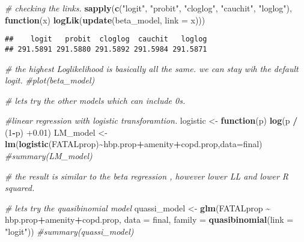 \documentclass[]{article}
\newenvironment{Shaded}{\begin{snugshade}}{\end{snugshade}}
\newcommand{\CommentTok}[1]{\textcolor[rgb]{0.56,0.35,0.01}{\textit{#1}}}
\newcommand{\ControlFlowTok}[1]{\textcolor[rgb]{0.13,0.29,0.53}{\textbf{#1}}}
\newcommand{\DataTypeTok}[1]{\textcolor[rgb]{0.13,0.29,0.53}{#1}}
\newcommand{\DecValTok}[1]{\textcolor[rgb]{0.00,0.00,0.81}{#1}}
\newcommand{\FloatTok}[1]{\textcolor[rgb]{0.00,0.00,0.81}{#1}}
\newcommand{\KeywordTok}[1]{\textcolor[rgb]{0.13,0.29,0.53}{\textbf{#1}}}
\newcommand{\NormalTok}[1]{#1}
\newcommand{\OperatorTok}[1]{\textcolor[rgb]{0.81,0.36,0.00}{\textbf{#1}}}
\newcommand{\StringTok}[1]{\textcolor[rgb]{0.31,0.60,0.02}{#1}}
\begin{document}
\begin{Shaded}
\begin{Highlighting}[]
\CommentTok{\# checking the links.}
\KeywordTok{sapply}\NormalTok{(}\KeywordTok{c}\NormalTok{(}\StringTok{"logit"}\NormalTok{, }\StringTok{"probit"}\NormalTok{, }\StringTok{"cloglog"}\NormalTok{, }\StringTok{"cauchit"}\NormalTok{, }\StringTok{"loglog"}\NormalTok{),}
\ControlFlowTok{function}\NormalTok{(x) }\KeywordTok{logLik}\NormalTok{(}\KeywordTok{update}\NormalTok{(beta\_model, }\DataTypeTok{link =}\NormalTok{ x)))}
\end{Highlighting}
\end{Shaded}

\begin{verbatim}
##    logit   probit  cloglog  cauchit   loglog 
## 291.5891 291.5880 291.5892 291.5984 291.5871
\end{verbatim}

\begin{Shaded}
\begin{Highlighting}[]
\CommentTok{\# the highest Loglikelihood is basically all the same. we can stay wih the default logit. }
\CommentTok{\#plot(beta\_model)}


\CommentTok{\# lets try the other models which can include 0\textquotesingle{}s. }

\CommentTok{\#linear regression with logistic transforamtion.}
\NormalTok{logistic \textless{}{-}}\StringTok{ }\ControlFlowTok{function}\NormalTok{(p) }\KeywordTok{log}\NormalTok{(p }\OperatorTok{/}\StringTok{ }\NormalTok{(}\DecValTok{1}\OperatorTok{{-}}\NormalTok{p) }\FloatTok{+0.01}\NormalTok{)}
\NormalTok{LM\_model \textless{}{-}}\StringTok{ }\KeywordTok{lm}\NormalTok{(}\KeywordTok{logistic}\NormalTok{(FATALprop)}\OperatorTok{\textasciitilde{}}\NormalTok{hbp.prop}\OperatorTok{+}\NormalTok{amenity}\OperatorTok{+}\NormalTok{copd.prop,}\DataTypeTok{data=}\NormalTok{final)}
\CommentTok{\#summary(LM\_model)}

\CommentTok{\# the result is similar to the beta regression , however lower LL and lower R squared. }


\CommentTok{\# lets try the quasibinomial model}
\NormalTok{quassi\_model \textless{}{-}}\StringTok{ }\KeywordTok{glm}\NormalTok{(FATALprop }\OperatorTok{\textasciitilde{}}\StringTok{ }\NormalTok{hbp.prop}\OperatorTok{+}\NormalTok{amenity}\OperatorTok{+}\NormalTok{copd.prop,  }\DataTypeTok{data =}\NormalTok{ final, }\DataTypeTok{family =} \KeywordTok{quasibinomial}\NormalTok{(}\DataTypeTok{link =} \StringTok{"logit"}\NormalTok{))}
\CommentTok{\#summary(quassi\_model)}
\end{Highlighting}
\end{Shaded}
\end{document}
